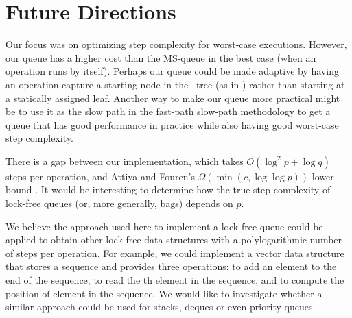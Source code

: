 
\section{Future Directions}

Our focus was on optimizing step complexity for worst-case executions.
However, our queue has a higher cost than the MS-queue in the best case (when an operation
runs by itself).
Perhaps our queue could be made adaptive by having an operation capture a starting node
in the \ordering\ tree (as in \cite{DBLP:conf/stoc/AfekDT95}) rather than starting at a statically assigned leaf.
Another way to make our queue more practical might be to use it as the slow path in the
fast-path slow-path methodology  \cite{10.1145/2370036.2145835} to
get a queue that has good performance in practice while also having good worst-case step complexity.

There is a gap between our implementation, which takes $O(\log^2 p + \log q)$ steps per operation,
and Attiya and Fouren's $\Omega(\min(c,\log\log p))$ lower bound \cite{DBLP:conf/opodis/AttiyaF17}.
It would be interesting to determine how the true step complexity of lock-free queues (or, more generally, bags)
depends on $p$.

We believe the approach used here to implement a lock-free queue 
could be applied to obtain other lock-free
data structures with a polylogarithmic number of steps per operation.
For example, we could implement a  vector data structure that stores a sequence and
provides three operations:  to add an element  to the end of the sequence,
 to read the th element in the sequence, and
 to compute the position of element  in the sequence.
We would like to investigate whether a similar approach could be used for stacks, deques or even priority queues.

